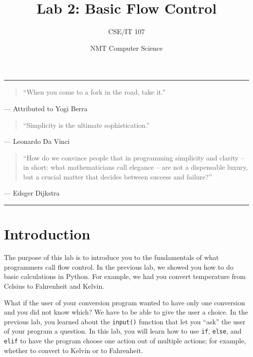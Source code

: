 \documentclass[11pt,hidelinks]{article}
\title{Lab 2: Basic Flow Control}
\author{CSE/IT 107}
\date{NMT Computer Science}
\begin{document}
\maketitle

\hrule

\begin{quotation}
``When you come to a fork in the road, take it."
\end{quotation}
\begin{flushright}
--- Attributed to Yogi Berra
\end{flushright}

\begin{quotation}
``Simplicity is the ultimate sophistication.''
\end{quotation}
\begin{flushright}
--- Leonardo Da Vinci
\end{flushright}

\begin{quotation}
``How do we convince people that in programming simplicity and clarity -- in
short: what mathematicians call elegance -- are not a dispensable luxury, but
a crucial matter that decides between success and failure?''
\end{quotation}
\begin{flushright}
--- Edsger Dijkstra
\end{flushright}

\hrule

\section{Introduction}
The purpose of this lab is to introduce you to the fundamentals of what
programmers call flow control. In the previous lab, we showed you how to do
basic calculations in Python. For example, we had you convert temperature from
Celsius to Fahrenheit and Kelvin.

What if the user of your conversion program wanted to have only one conversion
and you did not know which? We have to be able to give the user a choice. In the
previous lab, you learned about the \lstinline!input()! function that let you
``ask'' the user of your program a question. In this lab, you will learn how to
use \lstinline!if!, \lstinline!else!, and \lstinline!elif! to have the program
choose one action out of multiple actions; for example, whether to convert to
Kelvin or to Fahrenheit.
\end{document}
